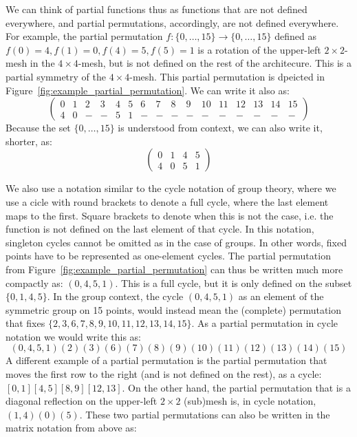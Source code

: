 We can think of partial functions thus as functions that are not defined everywhere, and partial permutations, accordingly, are not defined everywhere.
For example, the partial permutation $f : \{0,\ldots,15\} \rightarrow \{0,\ldots,15\}$ defined as $f(0) = 4, f(1) = 0, f(4) = 5, f(5) = 1$ is a rotation of the upper-left $2 \times 2$-mesh in the $4\times 4$-mesh, but is not defined on the rest of the architecure. This is a partial symmetry of the $4\times 4$-mesh. This partial permutation is dpeicted in Figure~\ref{fig:example_partial_permutation}. We can write it also as:
\begin{equation*}
\left(
\begin{array}{llllllllllllllll}
0 & 1 & 2 & 3 & 4 & 5 & 6 & 7 & 8 & 9 & 10 & 11 & 12 & 13 & 14 & 15\\
4 & 0 & - & - & 5 & 1 & - & - & - & - &  - &  - &  - &  - &  - &  -
\end{array}
\right)
\end{equation*}
Because the set $\{0,\ldots,15\}$ is understood from context, we can also write it, shorter, as:
\begin{equation*}
\left(
\begin{array}{llll}
0 & 1 & 4 & 5 \\
4 & 0 &  5 & 1
\end{array}
\right)
\end{equation*}

We also use a notation similar to the cycle notation of group theory, where we use a cicle with round brackets to denote a full cycle, where the last element maps to the first.
Square brackets to denote when this is not the case, i.e. the function is not defined on the last element of that cycle. In this notation, singleton cycles cannot be omitted as in the case of groups.
In other words, fixed points have to be represented as one-element cycles.
The partial permutation from Figure~\ref{fig:example_partial_permutation} can thus be written much more compactly as: $(0,4,5,1)$.
This is a full cycle, but it is only defined on the subset $\{0,1,4,5\}$.
In the group context, the cycle $(0,4,5,1)$ as an element of the symmetric group on 15 points, would instead mean the (complete) permutation that fixes $\{2,3,6,7,8,9,10,11,12,13,14,15\}$.
As a partial permutation in cycle notation we would write this as: \[(0,4,5,1)(2)(3)(6)(7)(8)(9)(10)(11)(12)(13)(14)(15) \]
A different example of a partial permutation is the partial permutation that moves the first row to the right (and is not defined on the rest), as a cycle: $[0,1][4,5][8,9][12,13]$.
On the other hand, the partial permutation that is a diagonal reflection on the upper-left $2 \times 2$ (sub)mesh is, in cycle notation, $(1,4)(0)(5)$.
These two partial permutations can also be written in the matrix notation from above as:

